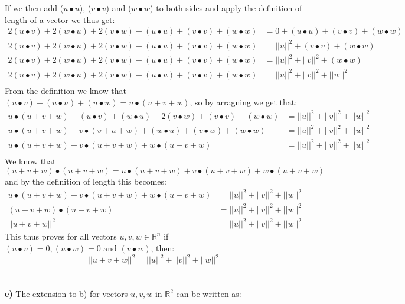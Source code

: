 \documentclass[11pt]{article}
\begin{document}
If we then add ($u \bullet u$), ($v \bullet v$) and ($w \bullet w$) to both sides and apply the definition of length of a vector we thus get:
\begin{align*}
2(u \bullet v)  + 2(w \bullet u) + 2(v \bullet w) + (u \bullet u) + (v \bullet v) + (w \bullet w) &= 0 + (u \bullet u) + (v \bullet v) + (w \bullet w)\\
2(u \bullet v)  + 2(w \bullet u) + 2(v \bullet w) + (u \bullet u) + (v \bullet v) + (w \bullet w) &= ||u||^2 + (v \bullet v) + (w \bullet w)\\
2(u \bullet v)  + 2(w \bullet u) + 2(v \bullet w) + (u \bullet u) + (v \bullet v) + (w \bullet w) &= ||u||^2 + ||v||^2 + (w \bullet w)\\
2(u \bullet v)  + 2(w \bullet u) + 2(v \bullet w) + (u \bullet u) + (v \bullet v) + (w \bullet w) &= ||u||^2 + ||v||^2 + ||w||^2\\
\end{align*}
From the definition we know that $(u \bullet v) + (u \bullet u) + (u \bullet w)  = u \bullet ( u+ v + w)$, so by arragning we get that:
\begin{align*}
u \bullet (u+v +w)  + (u \bullet v)  + (w \bullet u) + 2(v \bullet w) + (v \bullet v) + (w \bullet w) &= ||u||^2 + ||v||^2 + ||w||^2\\
u \bullet (u+v +w)  + v \bullet(v + u + w)  + (w \bullet u) + (v \bullet w) + (w \bullet w) &= ||u||^2 + ||v||^2 + ||w||^2\\
u \bullet (u+v +w)  + v \bullet(u + v + w)  + w \bullet (u + v + w)  &= ||u||^2 + ||v||^2 + ||w||^2\\
\end{align*}
We know that $(u+v+w) \bullet (u + v + w) = u \bullet (u+v +w)  + v \bullet(u + v + w)  + w \bullet (u + v + w)$ and by the definition of length this becomes:
\begin{align*}
u \bullet (u+v +w)  + v \bullet(u + v + w)  + w \bullet (u + v + w)  &= ||u||^2 + ||v||^2 + ||w||^2\\
(u+v+w) \bullet (u+v +w)   &= ||u||^2 + ||v||^2 + ||w||^2\\
||u+v +w||^2   &= ||u||^2 + ||v||^2 + ||w||^2
\end{align*}
This thus proves for all vectors $u,v,w \in \mathbb{R}^n$ if $(u \bullet v) = 0, (u \bullet w) = 0 \text{ and } (v \bullet w)$, then:
\[||u+v +w||^2   = ||u||^2 + ||v||^2 + ||w||^2\]\\\\
\textbf{e)} The extension to b) for vectors $u,v,w$ in $\mathbb{R}^2$ can be written as:
\end{document}
